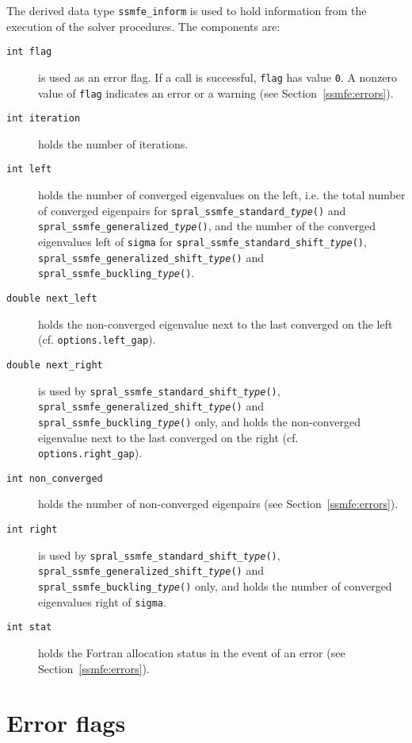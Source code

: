 \label{ssmfe:type:inform}

The derived data type {\tt ssmfe\_inform} is used
to hold information from the execution of
the solver procedures.
The components are:

\begin{description}
%
\item[\texttt{int flag}]
is used as an error flag.
If a call is successful, {\tt flag} has value {\tt 0}.
A nonzero value of {\tt flag} indicates an error or a warning
(see Section~\ref{ssmfe:errors}).
%
\item[\texttt{int iteration}] holds the number of iterations.
%
\item[\texttt{int left}] holds 
the number of converged eigenvalues on the left,
i.e. the total number of converged eigenpairs for 
{\tt spral\_ssmfe\_standard\_\textit{type}()} and {\tt spral\_ssmfe\_generalized\_\textit{type}()},
and the number of the converged eigenvalues left of {\tt sigma}
for {\tt spral\_ssmfe\_standard\_shift\_\textit{type}()},
{\tt spral\_ssmfe\_generalized\_shift\_\textit{type}()}
and {\tt spral\_ssmfe\_buckling\_\textit{type}()}.
%
\item[\texttt{double next\_left}] holds
the non-converged eigenvalue next to the last converged on the left
(cf. {\tt options.left\_gap}).
%
\item[\texttt{double next\_right}] is used by
{\tt spral\_ssmfe\_standard\_shift\_\textit{type}()},
{\tt spral\_ssmfe\_generalized\_shift\_\textit{type}()}
and {\tt spral\_ssmfe\_buckling\_\textit{type}()} only, and holds
the non-converged eigenvalue next to the last converged on the right
(cf. {\tt options.right\_gap}).
%
\item[\texttt{int non\_converged}]
holds the number of non-converged eigenpairs
(see Section~\ref{ssmfe:errors}).
%
\item[\texttt{int right}] is used by 
{\tt spral\_ssmfe\_standard\_shift\_\textit{type}()},
{\tt spral\_ssmfe\_generalized\_shift\_\textit{type}()}
and {\tt spral\_ssmfe\_buckling\_\textit{type}()} only, and holds
the number of converged eigenvalues right of {\tt sigma}.
%
\item[\texttt{int stat}] holds the Fortran allocation status in the event of an error
(see Section~\ref{ssmfe:errors}).
%
\end{description}

\section{Error flags}

